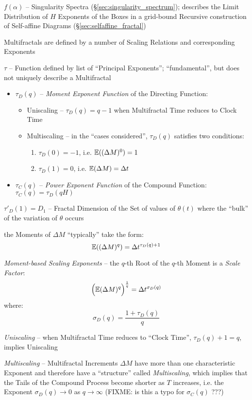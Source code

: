 $f(\alpha)$ -- Singularity Spectra (\S\ref{sec:singularity_spectrum}); describes
the Limit Distribution of $H$ Exponents of the Boxes in a grid-bound Recursive
construction of Self-affine Diagrams (\S\ref{sec:selfaffine_fractal})

Multifractals are defined by a number of Scaling Relations and corresponding
Exponents

$\tau$ -- Function defined by list of ``Principal Exponents''; ``fundamental'',
but does not uniquely describe a Multifractal

\begin{itemize}
  \item $\tau_D(q)$ -- \emph{Moment Exponent Function} of the Directing
    Function:
    \begin{itemize}
      \item Uniscaling -- $\tau_D(q) = q - 1$ when Multifractal Time reduces to
        Clock Time
      \item Multiscaling -- in the ``cases considered'', $\tau_D(q)$ satisfies
        two conditions:
        \begin{enumerate}
          \item $\tau_D(0) = -1$, i.e. $\mathbb{E}((\Delta M)^0) = 1$
          \item $\tau_D(1) = 0$, i.e. $\mathbb{E}(\Delta M) = \Delta t$
        \end{enumerate}
    \end{itemize}
  \item $\tau_C(q)$ -- \emph{Power Exponent Function} of the Compound Function:
    $\tau_C(q) = \tau_D(qH)$
\end{itemize}

$\tau'_D(1) = D_1$ -- Fractal Dimension of the Set of values of $\theta(t)$
where the ``bulk'' of the variation of $\theta$ occurs

the Moments of $\Delta M$ ``typically'' take the form:
\[
  \mathbb{E}((\Delta M)^q) = \Delta t^{\tau_D(q) + 1}
\]

\emph{Moment-based Scaling Exponents} -- the $q$-th Root of the $q$-th Moment is
a \emph{Scale Factor}:
\[
  \Big(\mathbb{E}(\Delta M)^q\Big)^\frac{1}{q} = \Delta t^{\sigma_D(q)}
\]
where:
\[
  \sigma_D(q) = \frac{1 + \tau_D(q)}{q}
\]

\emph{Uniscaling} -- when Multifractal Time reduces to ``Clock Time'',
$\tau_D(q) + 1 = q$, implies Uniscaling

\emph{Multiscaling} -- Multifractal Increments $\Delta M$ have more than one
characteristic Exponent and therefore have a ``structure'' called
\emph{Multiscaling}, which implies that the Tails of the Compound Process become
shorter as $T$ increases, i.e. the Exponent $\sigma_D(q) \to 0$ as
$q \to \infty$ (FIXME: is this a typo for $\sigma_C(q)$ ???)

